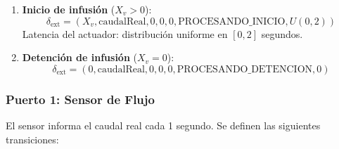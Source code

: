 \documentclass[12pt,a4paper,oneside]{report}
\begin{document}
\begin{enumerate}
    \item \textbf{Inicio de infusión} ($X_v > 0$):
    \[
    \delta_{\text{ext}} = (X_v, \text{caudalReal}, 0, 0, 0, \text{PROCESANDO\_INICIO}, U(0, 2))
    \]
    Latencia del actuador: distribución uniforme en $[0, 2]$ segundos.
    
    \item \textbf{Detención de infusión} ($X_v = 0$):
    \[
    \delta_{\text{ext}} = (0, \text{caudalReal}, 0, 0, 0, \text{PROCESANDO\_DETENCION}, 0)
    \]
\end{enumerate}

\subsubsection{Puerto 1: Sensor de Flujo}

El sensor informa el caudal real cada 1 segundo. Se definen las siguientes transiciones:
\end{document}
